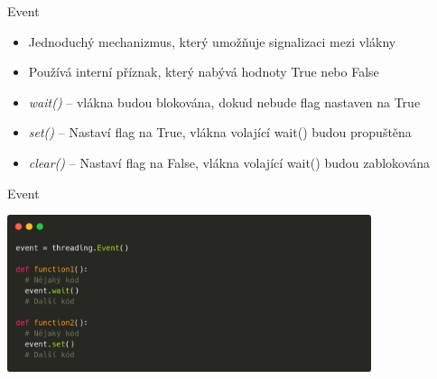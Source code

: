 \documentclass{beamer}
\begin{document}
\begin{frame}{Event}
    \begin{itemize}
        \item Jednoduchý mechanizmus, který umožňuje signalizaci mezi vlákny
        \item Používá interní příznak, který nabývá hodnoty True nebo False
        \vskip 0.25in

        \item \textit{wait()} – vlákna budou blokována, dokud nebude flag nastaven na True
        \item \textit{set()} – Nastaví flag na True, vlákna volající wait() budou propuštěna
        \item \textit{clear()} – Nastaví flag na False, vlákna volající wait() budou zablokována
    \end{itemize}
\end{frame}

\begin{frame}[fragile]{Event}
    \begin{center}
        \includegraphics[width=0.8\textwidth]{obrazky/codes/carbon5.png}
    \end{center}
\end{frame}
\end{document}
